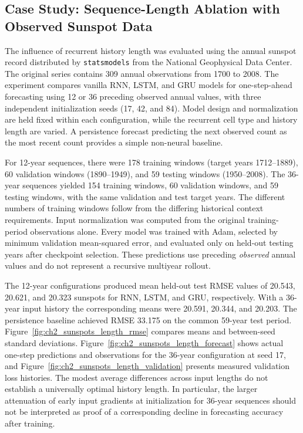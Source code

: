 \subsection{Case Study: Sequence-Length Ablation with Observed Sunspot Data}
\label{sec:ch2_sunspot_length_ablation}
The influence of recurrent history length was evaluated using the annual sunspot record distributed by \texttt{statsmodels} from the National Geophysical Data Center. The original series contains 309 annual observations from 1700 to 2008. The experiment compares vanilla RNN, LSTM, and GRU models for one-step-ahead forecasting using 12 or 36 preceding observed annual values, with three independent initialization seeds (17, 42, and 84). Model design and normalization are held fixed within each configuration, while the recurrent cell type and history length are varied. A persistence forecast predicting the next observed count as the most recent count provides a simple non-neural baseline.

For 12-year sequences, there were 178 training windows (target years 1712--1889), 60 validation windows (1890--1949), and 59 testing windows (1950--2008). The 36-year sequences yielded 154 training windows, 60 validation windows, and 59 testing windows, with the same validation and test target years. The different numbers of training windows follow from the differing historical context requirements. Input normalization was computed from the original training-period observations alone. Every model was trained with Adam, selected by minimum validation mean-squared error, and evaluated only on held-out testing years after checkpoint selection. These predictions use preceding \emph{observed} annual values and do not represent a recursive multiyear rollout.

The 12-year configurations produced mean held-out test RMSE values of 20.543, 20.621, and 20.323 sunspots for RNN, LSTM, and GRU, respectively. With a 36-year input history the corresponding means were 20.591, 20.344, and 20.203. The persistence baseline achieved RMSE 33.175 on the common 59-year test period. Figure~\ref{fig:ch2_sunspots_length_rmse} compares means and between-seed standard deviations. Figure~\ref{fig:ch2_sunspots_length_forecast} shows actual one-step predictions and observations for the 36-year configuration at seed 17, and Figure~\ref{fig:ch2_sunspots_length_validation} presents measured validation loss histories. The modest average differences across input lengths do not establish a universally optimal history length. In particular, the larger attenuation of early input gradients at initialization for 36-year sequences should not be interpreted as proof of a corresponding decline in forecasting accuracy after training.

